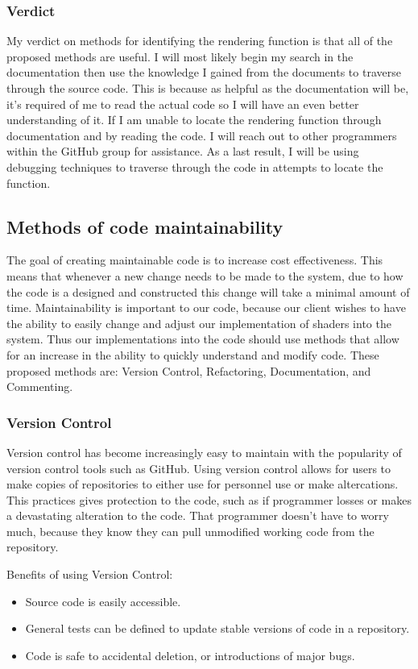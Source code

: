 \documentclass[10pt,journal,compsoc,draftclsnofoot]{IEEEtran}
\begin{document}
\subsubsection{Verdict}
My verdict on methods for identifying the rendering function is that all of the proposed methods are useful.
I will most likely begin my search in the documentation then use the knowledge I gained from the documents to traverse through the source code.
This is because as helpful as the documentation will be, it's required of me to read the actual code so I will have an even better understanding of it.
If I am unable to locate the rendering function through documentation and by reading the code.
I will reach out to other programmers within the GitHub group for assistance.
As a last result, I will be using debugging techniques to traverse through the code in attempts to locate the function.

\newpage
\subsection{Methods of code maintainability}
The goal of creating maintainable code is to increase cost effectiveness.
This means that whenever a new change needs to be made to the system, due to how the code is a designed and constructed this change will take a minimal amount of time.\cite{maintainability}
Maintainability is important to our code, because our client wishes to have the ability to easily change and adjust our implementation of shaders into the system.
Thus our implementations into the code should use methods that allow for an increase in the ability to quickly understand and modify code.
These proposed methods are: Version Control, Refactoring, Documentation, and Commenting.

\subsubsection{Version Control}
Version control has become increasingly easy to maintain with the popularity of version control tools such as GitHub.
Using version control allows for users to make copies of repositories to either use for personnel use or make altercations.
This practices gives protection to the code, such as if programmer losses or makes a devastating alteration to the code.
That programmer doesn't have to worry much, because they know they can pull unmodified working code from the repository.\cite{version}

Benefits of using Version Control:
\begin{itemize}
\item Source code is easily accessible.
\item General tests can be defined to update stable versions of code in a repository.
\item Code is safe to accidental deletion, or introductions of major bugs.
\end{itemize}
\end{document}
